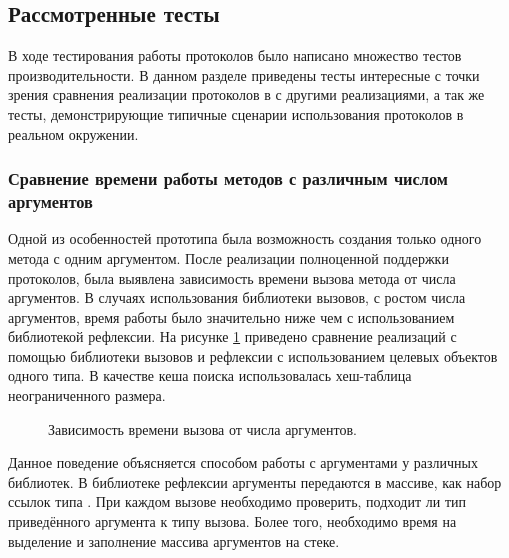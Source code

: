 \subsection{Рассмотренные тесты}
В ходе тестирования работы протоколов было написано множество тестов производительности. В данном разделе приведены тесты интересные с точки зрения сравнения реализации протоколов в  с другими реализациями, а так же тесты, демонстрирующие типичные сценарии использования протоколов в реальном окружении.

\subsubsection{Сравнение времени работы методов с различным числом аргументов}
Одной из особенностей прототипа была возможность создания только одного метода с одним аргументом. После реализации полноценной поддержки протоколов, была выявлена зависимость времени вызова метода от числа аргументов. В случаях использования библиотеки вызовов, с ростом числа аргументов, время работы было значительно ниже чем с использованием библиотекой рефлексии. На рисунке \ref{plot:bench:argsCount} приведено сравнение реализаций с помощью библиотеки вызовов и рефлексии с использованием целевых объектов одного типа. В качестве кеша поиска использовалась хеш-таблица неограниченного размера.

\begin{figure}
\caption{\label{plot:bench:argsCount}Зависимость времени вызова от числа аргументов.}
\end{figure}

Данное поведение объясняется способом работы с аргументами у различных библиотек. В библиотеке рефлексии аргументы передаются в массиве, как набор ссылок типа . При каждом вызове необходимо проверить, подходит ли тип приведённого аргумента к типу вызова. Более того, необходимо время на выделение и заполнение массива аргументов на стеке.

